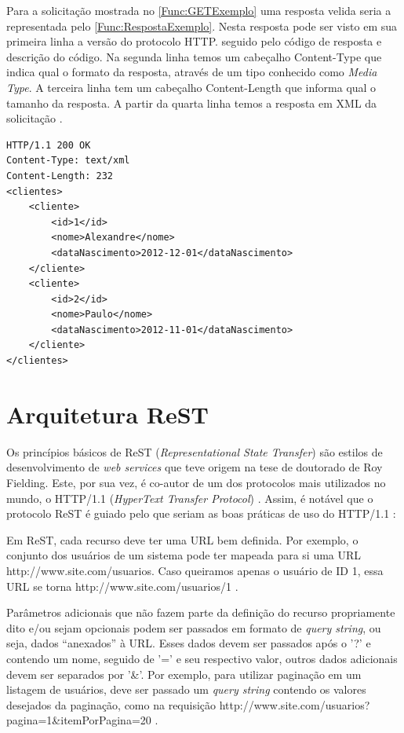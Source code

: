 Para a solicitação mostrada no \autoref{Func:GETExemplo} uma resposta velida seria a representada pelo \autoref{Func:RespostaExemplo}.
Nesta resposta pode ser visto em sua primeira linha a versão do protocolo HTTP. seguido pelo código de resposta e descrição do código.
Na segunda linha temos um cabeçalho Content-Type que indica qual o formato da resposta, através de um tipo conhecido como \textit{Media Type}.
A terceira linha tem um cabeçalho Content-Length que informa qual o tamanho da resposta.
A partir da quarta linha temos a resposta em XML da solicitação \cite{Saudate:2014}.



\begin{lstlisting}[label=Func:RespostaExemplo,caption={[Exemplo de uma resposta HTTP com status 200.]Exemplo de uma resposta HTTP com status 200, possuindo um Content-Type:text/xml informando que a resposta é em formato XML, e a resposta a solicitação.}]
HTTP/1.1 200 OK
Content-Type: text/xml
Content-Length: 232
<clientes>
	<cliente>
		<id>1</id>
		<nome>Alexandre</nome>
		<dataNascimento>2012-12-01</dataNascimento>
	</cliente>
	<cliente>
		<id>2</id>
		<nome>Paulo</nome>
		<dataNascimento>2012-11-01</dataNascimento>
	</cliente>
</clientes>
\end{lstlisting}


\section{Arquitetura ReST} \label{sec:ArquiteturaReST}

Os princípios básicos de ReST (\textit{Representational State Transfer}) são estilos de desenvolvimento
de \textit{web services} que teve origem na tese de doutorado de Roy Fielding. 
Este, por sua vez, é co-autor de um dos protocolos mais utilizados no mundo, o HTTP/1.1 (\textit{HyperText Transfer Protocol}) \cite{Boagrio:2017} \cite{Saudate:2014}.  
Assim, é notável que o protocolo ReST é guiado pelo que seriam as boas práticas de uso do HTTP/1.1 \cite{Saudate:2014}:


Em ReST, cada recurso deve ter uma URL bem definida. Por exemplo, o conjunto dos usuários de um sistema pode ter mapeada para si uma URL http://www.site.com/usuarios. Caso queiramos apenas o usuário de ID 1, essa URL se torna http://www.site.com/usuarios/1 \cite{Saudate:2012}.

Parâmetros adicionais que não fazem parte da definição do recurso propriamente dito e/ou sejam opcionais podem ser passados em formato de \textit{query string}, ou seja, dados “anexados” à URL. 
Esses dados devem ser passados após o '?' e contendo um nome, seguido de '=' e seu respectivo valor, outros dados adicionais devem ser separados por '\&'. 
Por exemplo, para utilizar paginação em um listagem de usuários, deve ser passado um \textit{query string} contendo os valores desejados da paginação, como na requisição http://www.site.com/usuarios?pagina=1\&itemPorPagina=20 \cite{Saudate:2012}.

